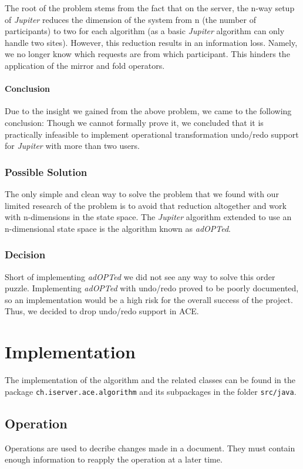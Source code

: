 The root of the problem stems from the fact that on the server, the
n-way setup of \emph{Jupiter} reduces the dimension of the system from
n (the number of participants) to two for 
each algorithm (as a basic \emph{Jupiter}
algorithm can only handle two sites). However, this reduction results in
an information loss. Namely, we no longer know which requests are from
which participant. This hinders the application of the mirror and fold
operators.

\paragraph{Conclusion}
Due to the insight we gained from the above problem, we came to the following conclusion: Though we cannot formally prove it, we concluded that it is practically infeasible to implement operational transformation undo/redo support for \emph{Jupiter} with more than two users.

\subsubsection{Possible Solution}
The only simple and clean way to solve the problem that we found with our
limited research of the problem is to avoid that reduction altogether and
work with n-dimensions in the state space. The \emph{Jupiter} algorithm
extended to use an n-dimensional state space is the algorithm
known as \emph{adOPTed}.

\subsubsection{Decision}
Short of implementing \emph{adOPTed} we did not see any way to solve
this order puzzle. Implementing \emph{adOPTed} with undo/redo proved to
be poorly documented, so an implementation would be a high risk for the
overall success of the project. Thus, we decided to drop undo/redo support in 
ACE.


\section{Implementation}
The implementation of the algorithm and the related classes can be found
in the package \texttt{ch.\-iserver.\-ace.\-algorithm} and its subpackages
in the folder \texttt{src/java}.

\subsection{Operation}
Operations are used to decribe changes made in a document. They must contain
enough information to reapply the operation at a later time.


